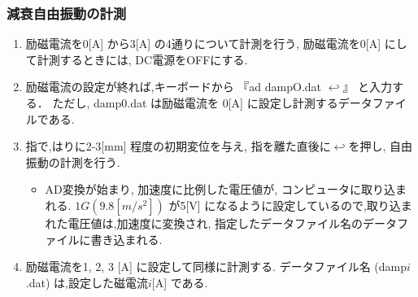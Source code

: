 \documentclass[a4paper,10.5pt]{jsarticle}
\begin{document}
\subsubsection{減衰自由振動の計測}
\begin{enumerate}
  \item 励磁電流を0[A] から3[A] の4通りについて計測を行う,
  励磁電流を0[A] にして計測するときには, DC電源をOFFにする.
  \item 励磁電流の設定が終れば,キーボードから 『ad dampO.dat  $\hookleftarrow$』 と入力する．
  ただし, damp0.dat は励磁電流を 0[A] に設定し計測するデータファイルである.
  \item 指で,はりに2-3[mm] 程度の初期変位を与え, 指を離た直後に$\hookleftarrow$を押し, 
  自由振動の計測を行う.
  \begin{itemize}
    \item AD変換が始まり, 加速度に比例した電圧値が, コンピュータに取り込まれる. $1G(9.8[m/s^2])$ 
    が5[V] になるように設定しているので,取り込まれた電圧値は,加速度に変換され, 
    指定したデータファイル名のデータファイルに書き込まれる.
  \end{itemize}
  \item 励磁電流を1, 2, 3 [A] に設定して同様に計測する.
  データファイル名 (damp$i$.dat) は,設定した磁電流$i$[A] である. 
\end{enumerate}
\end{document}
